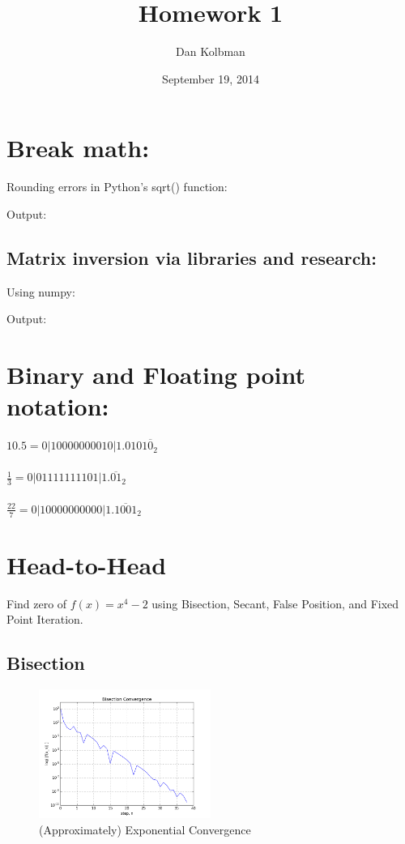 \documentclass[12pt]{article}
\title{Homework 1}
\author{Dan Kolbman}
\date{September 19, 2014}
\begin{document}
  
  \maketitle
 
  \section{Break math:}
  Rounding errors in Python's sqrt() function:
  
  Output:
  
  
  \clearpage

  \subsection{Matrix inversion via libraries and research:}
  Using numpy:
  
  Output:
  
  
  \section{Binary and Floating point notation:}
  $10.5 =         0|10000000010|1.0101\overline{0}_2$\\\\
  $\frac{1}{3} =  0|01111111101|1.\overline{01}_2$\\\\
  $\frac{22}{7} = 0|10000000000|1.\overline{1001}_2$
  
  \clearpage

  \section{Head-to-Head}
  Find zero of $f(x) = x^4 - 2$ using Bisection, Secant, False Position,
  and Fixed Point Iteration.

  \subsection{Bisection}
  
  \begin{figure}[h!]
    \centering
    \includegraphics[width=0.5\textwidth]{Problem4a.png}
    \caption{(Approximately) Exponential Convergence}
  \end{figure}
\end{document}

